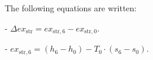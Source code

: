 The following equations are written:  

- \( \Delta ex_{\text{str}} = ex_{\text{str},6} - ex_{\text{str},0} \).  

- \( ex_{\text{str},6} = (h_6 - h_0) - T_0 \cdot (s_6 - s_0) \).